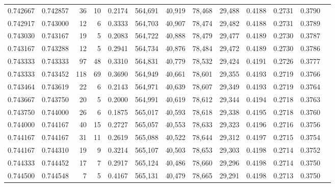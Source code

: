 \begin{tabular}{rrrrrrrrrrrrr}
0.742667 & 0.742857 &    36 &  10 &                                     0.2174 & 564,691 &  40,919 &  78,468 &  29,488 & 0.4188 & 0.2731 & 0.3790 \\
0.742917 & 0.743000 &    12 &   6 &                                     0.3333 & 564,703 &  40,907 &  78,474 &  29,482 & 0.4188 & 0.2731 & 0.3789 \\
0.743030 & 0.743167 &    19 &   5 &                                     0.2083 & 564,722 &  40,888 &  78,479 &  29,477 & 0.4189 & 0.2730 & 0.3787 \\
0.743167 & 0.743288 &    12 &   5 &                                     0.2941 & 564,734 &  40,876 &  78,484 &  29,472 & 0.4189 & 0.2730 & 0.3786 \\
0.743333 & 0.743333 &    97 &  48 &                                     0.3310 & 564,831 &  40,779 &  78,532 &  29,424 & 0.4191 & 0.2726 & 0.3777 \\
0.743333 & 0.743452 &   118 &  69 &                                     0.3690 & 564,949 &  40,661 &  78,601 &  29,355 & 0.4193 & 0.2719 & 0.3766 \\
0.743464 & 0.743619 &    22 &   6 &                                     0.2143 & 564,971 &  40,639 &  78,607 &  29,349 & 0.4193 & 0.2719 & 0.3764 \\
0.743667 & 0.743750 &    20 &   5 &                                     0.2000 & 564,991 &  40,619 &  78,612 &  29,344 & 0.4194 & 0.2718 & 0.3763 \\
0.743750 & 0.744000 &    26 &   6 &                                     0.1875 & 565,017 &  40,593 &  78,618 &  29,338 & 0.4195 & 0.2718 & 0.3760 \\
0.744000 & 0.744167 &    40 &  15 &                                     0.2727 & 565,057 &  40,553 &  78,633 &  29,323 & 0.4196 & 0.2716 & 0.3756 \\
0.744167 & 0.744167 &    31 &  11 &                                     0.2619 & 565,088 &  40,522 &  78,644 &  29,312 & 0.4197 & 0.2715 & 0.3754 \\
0.744167 & 0.744310 &    19 &   9 &                                     0.3214 & 565,107 &  40,503 &  78,653 &  29,303 & 0.4198 & 0.2714 & 0.3752 \\
0.744333 & 0.744452 &    17 &   7 &                                     0.2917 & 565,124 &  40,486 &  78,660 &  29,296 & 0.4198 & 0.2714 & 0.3750 \\
0.744500 & 0.744548 &     7 &   5 &                                     0.4167 & 565,131 &  40,479 &  78,665 &  29,291 & 0.4198 & 0.2713 & 0.3750 \\

\end{tabular}
